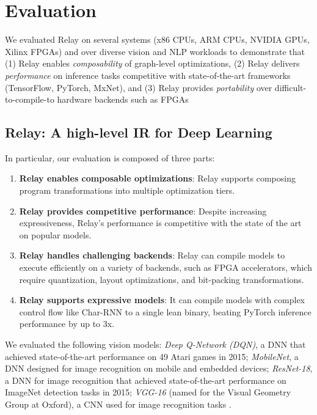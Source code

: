 \section{Evaluation}
\label{sec:eval}

We evaluated Relay on several systems (x86 CPUs, ARM CPUs, NVIDIA GPUs, Xilinx FPGAs) and over
  diverse vision and NLP workloads to demonstrate that (1) Relay enables \emph{composability} of
  graph-level optimizations, (2) Relay delivers \emph{performance} on inference tasks competitive
  with state-of-the-art frameworks (TensorFlow, PyTorch, MxNet), and (3) Relay provides
  \emph{portability} over difficult-to-compile-to hardware backends such as FPGAs

\subsection{Relay: A high-level IR for Deep Learning}
  In particular, our evaluation is composed of three parts:
  \begin{enumerate}
    \item \textbf{Relay enables composable optimizations}: Relay
      supports composing program transformations into multiple optimization tiers.
    \item \textbf{Relay provides competitive performance}: Despite increasing
      expressiveness, Relay's performance is competitive with the
      state of the art on popular models.
    \item \textbf{Relay handles challenging backends}: Relay can compile
      models to execute efficiently on a variety of
      backends, such as FPGA accelerators, which require quantization, layout
      optimizations, and bit-packing transformations.
    \item \textbf{Relay supports expressive models}: It can compile models with complex control flow
      like Char-RNN to a single lean binary, beating PyTorch inference performance by up to 3x.
  \end{enumerate}

  We evaluated the following vision models:
    \textit{Deep Q-Network (DQN)}, a DNN that achieved state-of-the-art performance
    on 49 Atari games in 2015;
    \textit{MobileNet}, a DNN designed for image recognition on mobile and
    embedded devices;
    \textit{ResNet-18}, a DNN for image recognition that achieved state-of-the-art
    performance on ImageNet detection tasks in 2015;
    \textit{VGG-16} (named for the Visual Geometry Group
    at Oxford), a CNN used for image recognition tasks
    \citep{dqn, mobilenet, resnet, vgg}.

